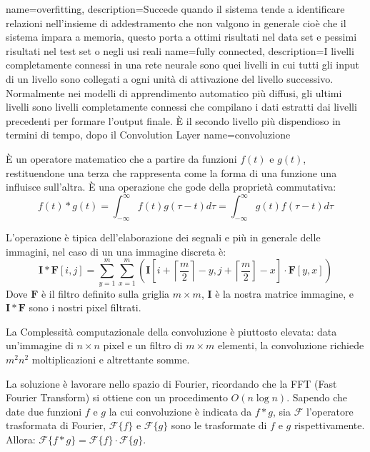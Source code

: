 {
    name=overfitting,
    description={Succede quando il sistema tende a identificare relazioni nell’insieme di addestramento che non valgono in generale cioè che il sistema impara a memoria, questo porta a ottimi risultati nel data set e pessimi risultati nel test set o negli usi reali}
}
{
    name={fully connected},
    description={I livelli completamente connessi in una rete neurale sono quei livelli in cui tutti gli input di
            un livello sono collegati a ogni unità di attivazione del livello successivo. Normalmente nei modelli di
            apprendimento automatico più diffusi, gli ultimi livelli sono livelli completamente connessi
            che compilano i dati estratti dai livelli precedenti per formare l’output finale. È il secondo
            livello più dispendioso in termini di tempo, dopo il \gls{Convolution Layer}}
}
{
    name=convoluzione}{
    È un operatore matematico che a partire da funzioni \(f(t)\) e \(g(t)\), restituendone una terza che rappresenta come la forma di una funzione una influisce sull’altra. È una operazione che gode della proprietà commutativa:
    \[ f ( t ) * g ( t ) = \int _ { - \infty } ^ { \infty } f ( t ) g ( \tau - t ) d \tau  = \int _ { - \infty } ^ { \infty } g ( t ) f ( \tau - t ) d \tau\]

    L'operazione è tipica dell'elaborazione dei segnali e più in generale delle immagini,  nel caso di un una immagine discreta è:\[ \mathbf { I } * \mathbf{F} [ i , j ] = \sum _ { y = 1 } ^ { m } \sum _ { x = 1 } ^ { m } \left( \mathbf { I } \left[ i + \left\lceil \frac { m } { 2 } \right\rceil - y , j + \left\lceil \frac { m } { 2 } \right] - x \right] \cdot \mathbf { F } [ y , x ] \right) \]
    Dove \(\mathbf{F}\) è il filtro definito sulla griglia \(m \times m\), \(\mathbf{I}\) è la nostra matrice immagine, e \(\mathbf { I } * \mathbf{F}\) sono i nostri pixel filtrati.

    La Complessità
    computazionale  della convoluzione è
    piuttosto elevata: data
    un’immagine di \(n\times n\)
    pixel e un filtro di
    \(m\times m\)
    elementi, la
    convoluzione
    richiede \(m^2 n^2\)
    moltiplicazioni e
    altrettante somme.

    La soluzione è lavorare nello spazio di Fourier, ricordando che la FFT (Fast Fourier Transform) si ottiene con un procedimento \(O(n \log n)\). Sapendo che date due funzioni  \( f \) e \( g \) la cui convoluzione è indicata da \( f * g \), sia \( \mathcal { F } \) l'operatore trasformata di Fourier,  \( \mathcal { F } \{ f \} \) e \( \mathcal { F } \{ g \} \) sono le trasformate di \( f \) e \( g \) rispettivamente. Allora:
    \( \mathcal { F } \{ f * g \} = \mathcal { F } \{ f \} \cdot \mathcal { F } \{ g \} \).}


